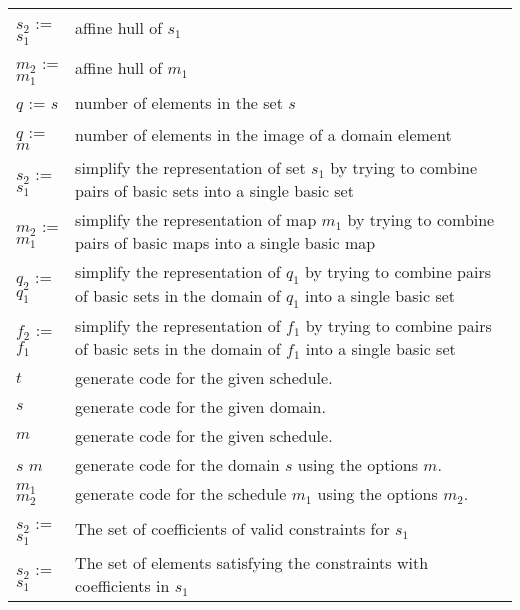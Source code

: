 \newpage
{}
\label{t:iscc}
\tablelasttail{}
\begin{supertabular}{p{0.35\textwidth}p{0.6\textwidth}}
$s_2$ :=  $s_1$ & affine hull of $s_1$
\\
$m_2$ :=  $m_1$ & affine hull of $m_1$
\\
$q$ :=  $s$ &
number of elements in the set $s$
\\
$q$ :=  $m$ &
number of elements in the image of a domain element
\\
$s_2$ :=  $s_1$ &
simplify the representation of set $s_1$ by trying
to combine pairs of basic sets into a single
basic set
\\
$m_2$ :=  $m_1$ &
simplify the representation of map $m_1$ by trying
to combine pairs of basic maps into a single
basic map
\\
$q_2$ :=  $q_1$ &
simplify the representation of $q_1$ by trying
to combine pairs of basic sets in the domain
of $q_1$ into a single basic set
\\
$f_2$ :=  $f_1$ &
simplify the representation of $f_1$ by trying
to combine pairs of basic sets in the domain
of $f_1$ into a single basic set
\\
 $t$ &
generate code for the given schedule.
\\
 $s$ &
generate code for the given domain.
\\
 $m$ &
generate code for the given schedule.
\\
 $s$  $m$ &
generate code for the domain $s$ using the options $m$.
\\
 $m_1$  $m_2$ &
generate code for the schedule $m_1$ using the options $m_2$.
\\
$s_2$ :=  $s_1$ &
The set of coefficients of valid constraints for $s_1$
\\
$s_2$ :=  $s_1$ &
The set of elements satisfying the constraints with coefficients in $s_1$

\end{supertabular}
